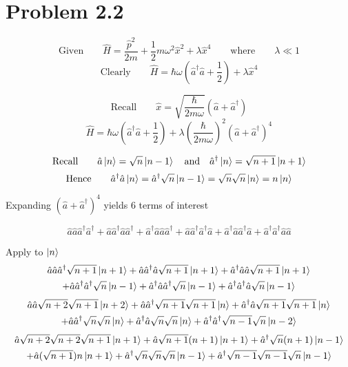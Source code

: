 \documentclass{amsart}
\begin{document}
\section*{Problem 2.2}
\[\text{Given}\qquad\hat{H}=\frac{\hat{p}^2}{2m}+\frac{1}{2}m\omega^2\hat{x}^2+\lambda\hat{x}^4\qquad\text{where}\qquad \lambda\ll 1 \]
\[\text{Clearly}\qquad\hat{H}=\hbar\omega\left(\hat{a}^\dagger \hat{a} +\frac{1}{2}\right)+\lambda\hat{x}^4\]

\[\text{Recall}\qquad\hat{x}=\sqrt{\frac{\hbar}{2m\omega}}(\hat{a}+\hat{a}^\dagger)   \]
\[\hat{H}=\hbar\omega\left(\hat{a}^\dagger \hat{a} +\frac{1}{2}\right)+\lambda\left(\frac{\hbar}{2m\omega}\right)^2(\hat{a}+\hat{a}^\dagger)^4\]

\[\text{Recall}\qquad\hat{a}\ket{n} =\sqrt{n}\ket{n-1} \qq{and} \hat{a}^\dagger\ket{n} =\sqrt{n+1}\ket{n+1}  \]
\[\text{Hence}\qquad\hat{a}^\dagger\hat{a}\ket{n} =\hat{a}^\dagger\sqrt{n}\ket{n-1}=\sqrt{n}\sqrt{n}\ket{n}=n\ket{n} \]

Expanding $(\hat{a}+\hat{a}^\dagger)^4$ yields 6 terms of interest

\[\hat{a}\hat{a}\hat{a}^\dagger\hat{a}^\dagger+\hat{a}\hat{a}^\dagger\hat{a}\hat{a}^\dagger+\hat{a}^\dagger\hat{a}\hat{a}\hat{a}^\dagger+\hat{a}\hat{a}^\dagger\hat{a}^\dagger\hat{a}+\hat{a}^\dagger\hat{a}\hat{a}^\dagger\hat{a}+\hat{a}^\dagger\hat{a}^\dagger\hat{a}\hat{a}\]

Apply to $\ket{n}$
\begin{multline*}
\hat{a}\hat{a}\hat{a}^\dagger\sqrt{n+1}\ket{n+1}+\hat{a}\hat{a}^\dagger\hat{a}\sqrt{n+1}\ket{n+1}+\hat{a}^\dagger\hat{a}\hat{a}\sqrt{n+1}\ket{n+1}\\+\hat{a}\hat{a}^\dagger\hat{a}^\dagger\sqrt{n}\ket{n-1}+\hat{a}^\dagger\hat{a}\hat{a}^\dagger\sqrt{n}\ket{n-1}+\hat{a}^\dagger\hat{a}^\dagger\hat{a}\sqrt{n}\ket{n-1}
\end{multline*}
\begin{multline*}
\hat{a}\hat{a}\sqrt{n+2}\sqrt{n+1}\ket{n+2}+\hat{a}\hat{a}^\dagger\sqrt{n+1}\sqrt{n+1}\ket{n}+\hat{a}^\dagger\hat{a}\sqrt{n+1}\sqrt{n+1}\ket{n}\\+\hat{a}\hat{a}^\dagger\sqrt{n}\sqrt{n}\ket{n}+\hat{a}^\dagger\hat{a}\sqrt{n}\sqrt{n}\ket{n}+\hat{a}^\dagger\hat{a}^\dagger\sqrt{n-1}\sqrt{n}\ket{n-2}
\end{multline*}
\begin{multline*}
\hat{a}\sqrt{n+2}\sqrt{n+2}\sqrt{n+1}\ket{n+1}+\hat{a}\sqrt{n+1}(n+1)\ket{n+1}+\hat{a}^\dagger\sqrt{n}(n+1)\ket{n-1}\\+\hat{a}(\sqrt{n+1})n\ket{n+1}+\hat{a}^\dagger\sqrt{n}\sqrt{n}\sqrt{n}\ket{n-1}+\hat{a}^\dagger\sqrt{n-1}\sqrt{n-1}\sqrt{n}\ket{n-1}
\end{multline*}
\end{document}
